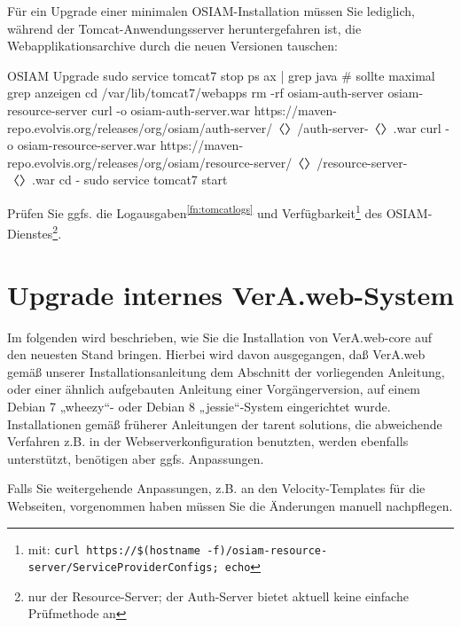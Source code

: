 \begin{minipage}{\textwidth}
Für ein Upgrade einer minimalen OSIAM-Installation müssen Sie
lediglich, während der Tomcat-Anwendungsserver heruntergefahren
ist, die Webapplikationsarchive durch die neuen Versionen tauschen:

\begin{lstdump}{OSIAM Upgrade}
sudo service tomcat7 stop
ps ax | grep java # sollte maximal grep anzeigen
cd /var/lib/tomcat7/webapps
rm -rf osiam-auth-server osiam-resource-server
curl -o osiam-auth-server.war https://maven-repo.evolvis.org/releases/org/osiam/auth-server/〈\lstdumpesc{\vwiaversosiam}〉/auth-server-〈\lstdumpesc{\vwiaversosiam}〉.war
curl -o osiam-resource-server.war https://maven-repo.evolvis.org/releases/org/osiam/resource-server/〈\lstdumpesc{\vwiaversosiam}〉/resource-server-〈\lstdumpesc{\vwiaversosiam}〉.war
cd -
sudo service tomcat7 start
\end{lstdump}
\end{minipage}

Prüfen Sie ggfs. die Logausgaben\Hair\textsuperscript{\ref{fn:tomcatlogs}}
und Verfügbarkeit\Hair\footnote{\label{fn:osiamcheck}mit:
\texttt{curl https://\$(hostname -f)/osiam-resource-server/ServiceProviderConfigs; echo}%
} des OSIAM-Dienstes\Hair\footnote{\label{fn:osiamsvcchk}nur der
Resource-Server; der Auth-Server bietet aktuell keine einfache Prüfmethode an}.

\fi%

\section{Upgrade internes VerA.web-System}\label{sec:upgrade-int}

Im folgenden wird beschrieben, wie Sie die Installation von
VerA.web-core auf den neuesten Stand bringen.
Hierbei wird davon ausgegangen, daß VerA.web gemäß
 \ifupgradeanleitung
  unserer Installationsanleitung
 \else%
  dem Abschnitt  der vorliegenden Anleitung,
  oder einer ähnlich aufgebauten Anleitung einer Vorgängerversion,
 \fi%
auf einem Debian 7 „wheezy“- oder Debian 8 „jessie“-System eingerichtet
wurde. Installationen gemäß früherer Anleitungen der tarent solutions,
die abweichende Verfahren z.B. in der Webserverkonfiguration benutzten,
werden ebenfalls unterstützt, benötigen aber ggfs. Anpassungen.

Falls Sie weitergehende Anpassungen, z.B. an den Velocity-Templates
für die Webseiten, vorgenommen haben müssen Sie die Änderungen
manuell nachpflegen.

